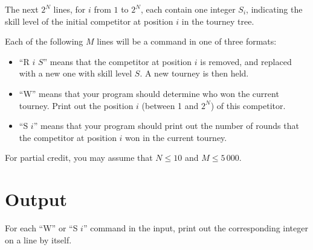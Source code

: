 The next $2^N$ lines, for $i$ from $1$ to $2^N$, each contain one integer $S_i$, indicating the
skill level of the initial competitor at position $i$ in the tourney tree.

Each of the following $M$ lines will be a command in one of three formats:
\begin{itemize}
\item ``R $i$ $S$'' means that the competitor at position $i$ is removed, and replaced with a new
one with skill level $S$. A new tourney is then held.
\item ``W'' means that your program should determine who won the current tourney. Print out the
position $i$ (between 1 and $2^N$) of this competitor.
\item “S $i$” means that your program should print out the number of rounds that the competitor at
position $i$ won in the current tourney.
\end{itemize}

For partial credit, you may assume that $N\le 10$ and $M\le 5\,000$.

\section*{Output}
For each ``W'' or ``S $i$'' command in the input, print out the corresponding integer on a line by
itself.
